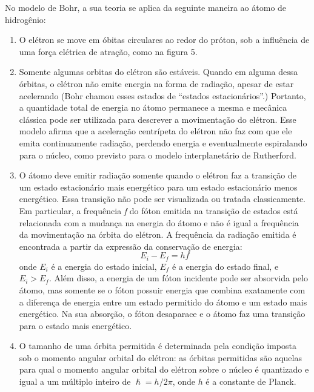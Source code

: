 \documentclass[12pt, letterpaper]{article}
\begin{document}
    No modelo de Bohr, a sua teoria se aplica da seguinte maneira ao átomo de hidrogênio:

    \begin{enumerate}
        \item O elétron se move em óbitas circulares ao redor do próton, sob a influência de uma força elétrica de atração, como na figura 5.
        \item Somente algumas orbitas do elétron são estáveis. Quando em alguma dessa órbitas, o elétron não emite energia na forma de radiação, apesar de estar acelerando (Bohr chamou esses estados de ``estados estacionários''.) Portanto, a quantidade total de energia no átomo permanece a mesma e mecânica clássica pode ser utilizada para descrever a movimentação do elétron. Esse modelo afirma que a aceleração centrípeta do elétron não faz com que ele emita continuamente radiação, perdendo energia e eventualmente espiralando para o núcleo, como previsto para o modelo interplanetário de Rutherford.
        \item O átomo deve emitir radiação somente quando o elétron faz a transição de um estado estacionário mais energético para um estado estacionário menos energético. Essa transição não pode ser visualizada ou tratada classicamente. Em particular, a frequência \textit{f} do fóton emitida na transição de estados está relacionada com a mudança na energia do átomo e não é igual a frequência da movimentação na órbita do elétron. A frequência da radiação emitida é encontrada a partir da expressão da conservação de energia:
        \begin{equation} \label{eq9}
            E_i - E_f = hf
        \end{equation}
        onde $E_i$ é a energia do estado inicial, $E_f$ é a energia do estado final, e $E_i > E_f$. Além disso, a energia de um fóton incidente pode ser absorvida pelo átomo, mas somente se o fóton possuir energia que combina exatamente com a diferença de energia entre um estado permitido do átomo e um estado mais energético. Na sua absorção, o fóton desaparace e o átomo faz uma transição para o estado mais energético.
        \item O tamanho de uma órbita permitida  é determinada pela condição imposta sob o momento angular orbital do elétron: as órbitas permitidas são aquelas para qual o momento angular orbital do elétron sobre o núcleo é quantizado e igual a um múltiplo inteiro de $\hslash = h/2\pi$, onde $h$ é a constante de Planck.

    \end{enumerate}
\end{document}
